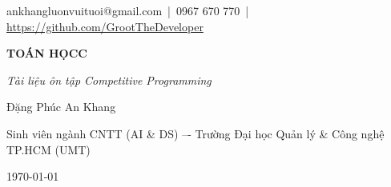\begin{titlepage}
\thispagestyle{empty}
\centering

\vspace*{1cm}

{\large ankhangluonvuituoi@gmail.com \,|\, 0967 670 770 \,|\, \url{https://github.com/GrootTheDeveloper}}\\[3.5cm]

{\fontsize{36}{40}\selectfont\bfseries TOÁN HỌCC\par} 
\vspace{0.6cm}
{\fontsize{18}{22}\selectfont\itshape Tài liệu ôn tập Competitive Programming \par}
\vspace{5cm}

{\Large Đặng Phúc An Khang\par}
\vspace{0.4cm}
{\large Sinh viên ngành CNTT (AI \& DS) –- Trường Đại học Quản lý \& Công nghệ TP.HCM (UMT)\par}
\vspace{1.2cm}

\vspace{10cm}

{\Large \today\par}

\vfill
\end{titlepage}
